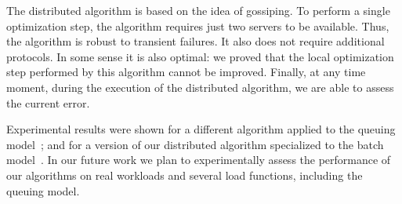 \documentclass[11pt]{article}
\begin{document}
The distributed algorithm is based on the idea of gossiping. To perform a single optimization step, the algorithm requires just two servers to be available. Thus, the algorithm is robust to transient failures. It also does not require additional protocols. In some sense it is also optimal: we  proved that the local optimization step performed by this algorithm cannot be improved. Finally, at any time moment, during the execution of the distributed algorithm, we are able to assess the current error.

Experimental results were shown for a different algorithm applied to the queuing model~\cite{Liu:2011:GGL:1993744.1993767}; and for a version of our distributed algorithm specialized to the batch model~\cite{Skowron:2013:NDL:2510648.2510769}.
In our future work we plan to experimentally assess the performance of our algorithms on real workloads and several load functions, including the queuing model.











\end{document}
